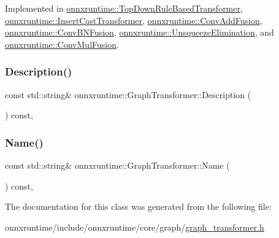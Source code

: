 Implemented in \mbox{\hyperlink{classonnxruntime_1_1TopDownRuleBasedTransformer_ae7604b4ac9da64b2bcae450b4759f624}{onnxruntime\+::\+Top\+Down\+Rule\+Based\+Transformer}}, \mbox{\hyperlink{classonnxruntime_1_1InsertCastTransformer_a059a832a759981af5fdeed0780e65904}{onnxruntime\+::\+Insert\+Cast\+Transformer}}, \mbox{\hyperlink{classonnxruntime_1_1ConvAddFusion_aacc7121b10b0bb9744117b7b227fdcb3}{onnxruntime\+::\+Conv\+Add\+Fusion}}, \mbox{\hyperlink{classonnxruntime_1_1ConvBNFusion_af12cb45d190871716c8e88f73b6b0bfa}{onnxruntime\+::\+Conv\+B\+N\+Fusion}}, \mbox{\hyperlink{classonnxruntime_1_1UnsqueezeElimination_afef298d0f56f50ee8b5336b103bbd96e}{onnxruntime\+::\+Unsqueeze\+Elimination}}, and \mbox{\hyperlink{classonnxruntime_1_1ConvMulFusion_abea2001e37642a6e2c667e115b6b23f0}{onnxruntime\+::\+Conv\+Mul\+Fusion}}.

\mbox{\label{classonnxruntime_1_1GraphTransformer_a277d37c8cd3de6208f5a1d76b6e16689}} 
\subsubsection{\texorpdfstring{Description()}{Description()}}
{\footnotesize\ttfamily const std\+::string\& onnxruntime\+::\+Graph\+Transformer\+::\+Description (\begin{DoxyParamCaption}{ }\end{DoxyParamCaption}) const\hspace{0.3cm}{\ttfamily [inline]}, {\ttfamily [noexcept]}}

\mbox{\label{classonnxruntime_1_1GraphTransformer_a280e21558a88f2a9b262d41b4a3d2e96}} 
\subsubsection{\texorpdfstring{Name()}{Name()}}
{\footnotesize\ttfamily const std\+::string\& onnxruntime\+::\+Graph\+Transformer\+::\+Name (\begin{DoxyParamCaption}{ }\end{DoxyParamCaption}) const\hspace{0.3cm}{\ttfamily [inline]}, {\ttfamily [noexcept]}}



The documentation for this class was generated from the following file\+:\begin{DoxyCompactItemize}
\item 
onnxruntime/include/onnxruntime/core/graph/\mbox{\hyperlink{graph__transformer_8h}{graph\+\_\+transformer.\+h}}\end{DoxyCompactItemize}
